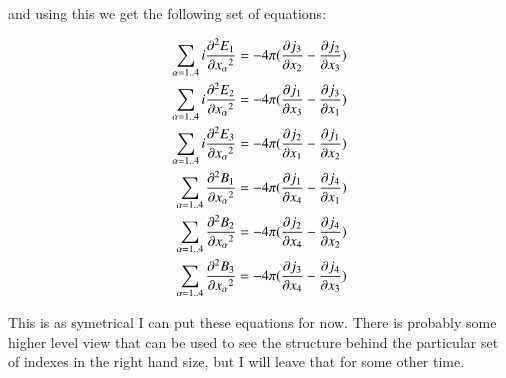 \documentclass{article}      %
\newcommand{\dds}[2]{ {{\partial^2{#1}} \over {\partial{#2}^2}}}
\newcommand{\D}[2] {{{\partial #2} \over {\partial #1}}}
\begin{document}
and using this we get the following set of equations:

\begin{align*}
\sum_{\alpha = 1 .. 4}{i \dds{E_1} {x_\alpha}} &= - 4\pi (\D {x_2}{j_3} - \D {x_3}{j_2}) \\
\sum_{\alpha = 1 .. 4}{i \dds{E_2} {x_\alpha}} &= - 4\pi (\D {x_3}{j_1} - \D {x_1}{j_3}) \\
\sum_{\alpha = 1 .. 4}{i \dds{E_3} {x_\alpha}} &= - 4\pi (\D {x_1}{j_2} - \D {x_2}{j_1}) \\
\sum_{\alpha = 1 .. 4}{\dds{B_1} {x_\alpha}} &= - 4\pi (\D {x_4}{j_1} - \D{x_1}{j_4})\\
\sum_{\alpha = 1 .. 4}{\dds{B_2} {x_\alpha}} &= - 4\pi (\D {x_4}{j_2} - \D{x_2}{j_4})\\
\sum_{\alpha = 1 .. 4}{\dds{B_3} {x_\alpha}} &= - 4\pi (\D {x_4}{j_3} - \D{x_3}{j_4})
\end{align*}

This is as symetrical I can put these equations for now.  There is probably some higher level 
view that can be used to see the structure behind the particular set of indexes in the right 
hand size, but I will leave that for some other time.
\end{document}
